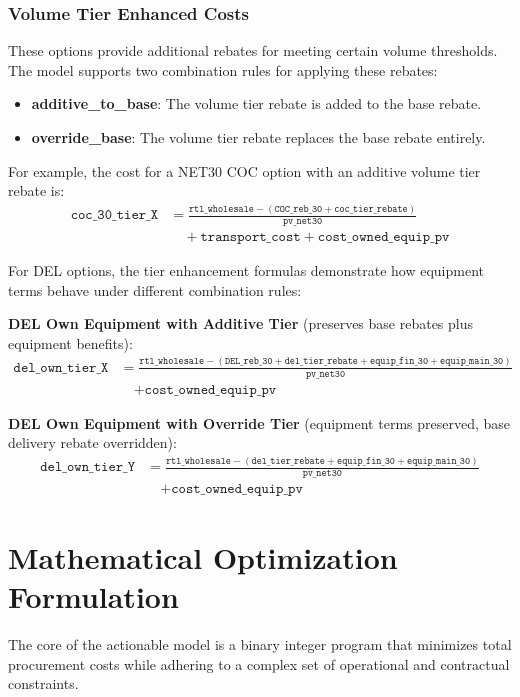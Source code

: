 \subsubsection{Volume Tier Enhanced Costs}
These options provide additional rebates for meeting certain volume thresholds. The model supports two combination rules for applying these rebates:
\begin{itemize}
    \item \textbf{additive\_to\_base}: The volume tier rebate is added to the base rebate.
    \item \textbf{override\_base}: The volume tier rebate replaces the base rebate entirely.
\end{itemize}
For example, the cost for a NET30 COC option with an additive volume tier rebate is:
\begin{align}
\texttt{coc\_30\_tier\_X} &= \frac{\texttt{rtl\_wholesale} - (\texttt{COC\_reb\_30} + \texttt{coc\_tier\_rebate})}{\texttt{pv\_net30}} \nonumber \\
&\quad + \texttt{transport\_cost} + \texttt{cost\_owned\_equip\_pv}
\end{align}

For DEL options, the tier enhancement formulas demonstrate how equipment terms behave under different combination rules:

\textbf{DEL Own Equipment with Additive Tier} (preserves base rebates plus equipment benefits):
\begin{align}
\texttt{del\_own\_tier\_X} &= \frac{\texttt{rtl\_wholesale} - (\texttt{DEL\_reb\_30} + \texttt{del\_tier\_rebate} + \texttt{equip\_fin\_30} + \texttt{equip\_main\_30})}{\texttt{pv\_net30}} \nonumber \\
&\quad + \texttt{cost\_owned\_equip\_pv}
\end{align}

\textbf{DEL Own Equipment with Override Tier} (equipment terms preserved, base delivery rebate overridden):
\begin{align}
\texttt{del\_own\_tier\_Y} &= \frac{\texttt{rtl\_wholesale} - (\texttt{del\_tier\_rebate} + \texttt{equip\_fin\_30} + \texttt{equip\_main\_30})}{\texttt{pv\_net30}} \nonumber \\
&\quad + \texttt{cost\_owned\_equip\_pv}
\end{align}

\section{Mathematical Optimization Formulation}
The core of the actionable model is a binary integer program that minimizes total procurement costs while adhering to a complex set of operational and contractual constraints.

